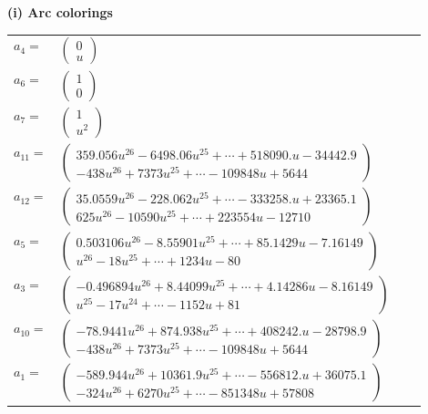 \documentclass[1p]{elsarticle_modified}
\theoremstyle{definition}
\begin{document}
\flushleft \textbf{(i) Arc colorings}\\
\begin{tabular}{m{7pt} m{180pt} m{7pt} m{180pt} }
\flushright $a_{4}=$&$\begin{pmatrix}0\\u\end{pmatrix}$ \\
\flushright $a_{6}=$&$\begin{pmatrix}1\\0\end{pmatrix}$ \\
\flushright $a_{7}=$&$\begin{pmatrix}1\\u^2\end{pmatrix}$ \\
\flushright $a_{11}=$&$\begin{pmatrix}359.056 u^{26}-6498.06 u^{25}+\cdots+518090. u-34442.9\\-438 u^{26}+7373 u^{25}+\cdots-109848 u+5644\end{pmatrix}$ \\
\flushright $a_{12}=$&$\begin{pmatrix}35.0559 u^{26}-228.062 u^{25}+\cdots-333258. u+23365.1\\625 u^{26}-10590 u^{25}+\cdots+223554 u-12710\end{pmatrix}$ \\
\flushright $a_{5}=$&$\begin{pmatrix}0.503106 u^{26}-8.55901 u^{25}+\cdots+85.1429 u-7.16149\\u^{26}-18 u^{25}+\cdots+1234 u-80\end{pmatrix}$ \\
\flushright $a_{3}=$&$\begin{pmatrix}-0.496894 u^{26}+8.44099 u^{25}+\cdots+4.14286 u-8.16149\\u^{25}-17 u^{24}+\cdots-1152 u+81\end{pmatrix}$ \\
\flushright $a_{10}=$&$\begin{pmatrix}-78.9441 u^{26}+874.938 u^{25}+\cdots+408242. u-28798.9\\-438 u^{26}+7373 u^{25}+\cdots-109848 u+5644\end{pmatrix}$ \\
\flushright $a_{1}=$&$\begin{pmatrix}-589.944 u^{26}+10361.9 u^{25}+\cdots-556812. u+36075.1\\-324 u^{26}+6270 u^{25}+\cdots-851348 u+57808\end{pmatrix}$ \\

\end{tabular}
\end{document}
